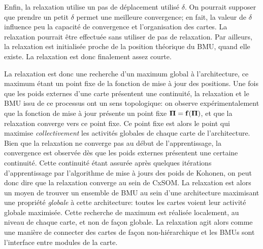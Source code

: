 \documentclass[../main]{subfiles}
\begin{document}
Enfin, la relaxation utilise un pas de déplacement utilisé $\delta$. 
On pourrait supposer que prendre un petit $\delta$ permet une meilleure convergence; en fait, la valeur de $\delta$ influence peu la capacité de convergence et l'organisation des cartes. La relaxation pourrait être effectuée sans utiliser de pas de relaxation. Par ailleurs, la relaxation est initialisée proche de la position théorique du BMU, quand elle existe. La relaxation est donc finalement assez courte.

La relaxation est donc une recherche d'un maximum global à l'architecture, ce maximum étant un point fixe de la fonction de mise à jour des positions.
Une fois que les poids externes d'une carte présentent une continuité, la relaxation et le BMU issu de ce processus ont un sens topologique: on observe expérimentalement que la fonction de mise à jour présente un point fixe $\mathbf{\Pi} = \mathbf{f}(\mathbf{\Pi})$, et que la relaxation converge vers ce point fixe. Ce point fixe est alors le point qui maximise \emph{collectivement} les activités globales de chaque carte de l'architecture.
Bien que la relaxation ne converge pas au début de l'apprentissage, la convergence est observée dès que les poids externes présentent une certaine continuité. Cette continuité étant assurée après quelques itérations d'apprentissage par l'algorithme de mise à jours des poids de Kohonen, on peut donc dire que la relaxation converge au sein de CxSOM.
La relaxation est alors un moyen de trouver un ensemble de BMU au sein d'une architecture maximisant une propriété \emph{globale} à cette architecture: toutes les cartes voient leur activité globale maximisée. 
Cette recherche de maximum est réalisée localement, au niveau de chaque carte, et non de façon globale. La relaxation agit alors comme une manière de connecter des cartes de façon non-hiérarchique et les BMUs sont l'interface entre modules de la carte.

\ifSubfilesClassLoaded{
    \printbibliography
}{}
\end{document}
